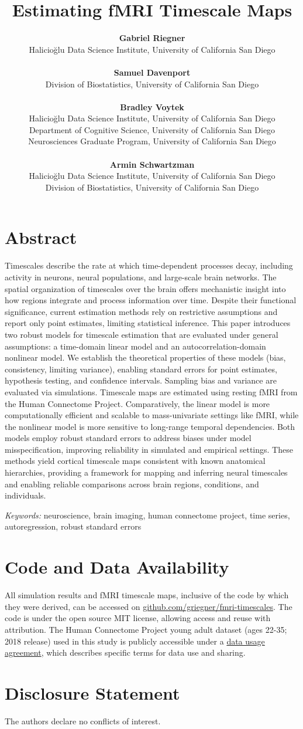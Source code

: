 \documentclass[9pt]{article}
\title{Estimating fMRI Timescale Maps}
\author{
\normalfont
\textbf{Gabriel Riegner}\\
Halicio\u{g}lu Data Science Institute, University of California San Diego\\\\
\textbf{Samuel Davenport}\\
Division of Biostatistics, University of California San Diego\\\\
\textbf{Bradley Voytek}\\
Halicio\u{g}lu Data Science Institute, University of California San Diego\\
Department of Cognitive Science, University of California San Diego\\
Neurosciences Graduate Program, University of California San Diego\\\\
\textbf{Armin Schwartzman}\\
Halicio\u{g}lu Data Science Institute, University of California San Diego\\
Division of Biostatistics, University of California San Diego\\
}
\date{}
\begin{document}
\maketitle

\section*{Abstract}
Timescales describe the rate at which time-dependent processes decay, including activity in neurons, neural populations, and large-scale brain networks. The spatial organization of timescales over the brain offers mechanistic insight into how regions integrate and process information over time. Despite their functional significance, current estimation methods rely on restrictive assumptions and report only point estimates, limiting statistical inference. This paper introduces two robust models for timescale estimation that are evaluated under general assumptions: a time-domain linear model and an autocorrelation-domain nonlinear model. We establish the theoretical properties of these models (bias, consistency, limiting variance), enabling standard errors for point estimates, hypothesis testing, and confidence intervals. Sampling bias and variance are evaluated via simulations. Timescale maps are estimated using resting fMRI from the Human Connectome Project. Comparatively, the linear model is more computationally efficient and scalable to mass-univariate settings like fMRI, while the nonlinear model is more sensitive to long-range temporal dependencies. Both models employ robust standard errors to address biases under model misspecification, improving reliability in simulated and empirical settings. These methods yield cortical timescale maps consistent with known anatomical hierarchies, providing a framework for mapping and inferring neural timescales and enabling reliable comparisons across brain regions, conditions, and individuals.

\vfill
\noindent\textit{Keywords:} neuroscience, brain imaging, human connectome project, time series, autoregression, robust standard errors
\thispagestyle{empty}
\newpage
\setcounter{page}{1}






\section*{Code and Data Availability}
All simulation results and fMRI timescale maps, inclusive of the code by which they were derived, can be accessed on \href{https://github.com/griegner/fmri-timescales}{github.com/griegner/fmri-timescales}. The code is under the open source MIT license, allowing access and reuse with attribution. The Human Connectome Project young adult dataset (ages 22-35; 2018 release) used in this study is publicly accessible under a \href{https://www.humanconnectome.org/storage/app/media/data_use_terms/DataUseTerms-HCP-Open-Access-26Apr2013.pdf}{data usage agreement}, which describes specific terms for data use and sharing.

\section*{Disclosure Statement}
The authors declare no conflicts of interest.

\bigskip

\end{document}
